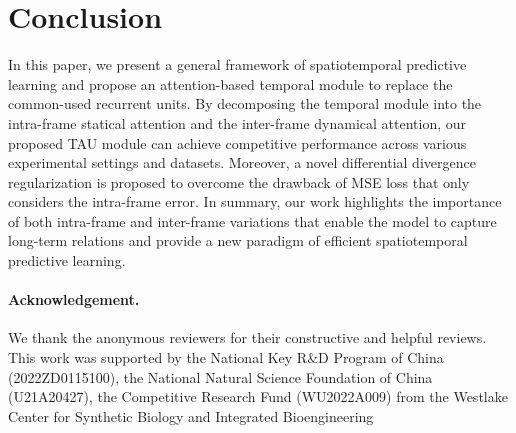\documentclass[10pt,twocolumn,letterpaper]{article}
\begin{document}
\begin{table}[h]
\centering
\caption{Ablation study of our proposed method.}
\vspace{-4mm}
\label{tab:ablation}
\end{table}

\section{Conclusion}

In this paper, we present a general framework of spatiotemporal predictive learning and propose an attention-based temporal module to replace the common-used recurrent units. By decomposing the temporal module into the intra-frame statical attention and the inter-frame dynamical attention, our proposed TAU module can achieve competitive performance across various experimental settings and datasets. Moreover, a novel differential divergence regularization is proposed to overcome the drawback of MSE loss that only considers the intra-frame error. In summary, our work highlights the importance of both intra-frame and inter-frame variations that enable the model to capture long-term relations and provide a new paradigm of efficient spatiotemporal predictive learning.

\paragraph{Acknowledgement.}
\vspace{-2mm}
We thank the anonymous reviewers for their constructive and helpful reviews. This work was supported by the National Key R\&D Program of China (2022ZD0115100), the National Natural Science Foundation of China (U21A20427), the Competitive Research Fund (WU2022A009) from the Westlake Center for Synthetic Biology and Integrated Bioengineering



{\small


}
\end{document}
